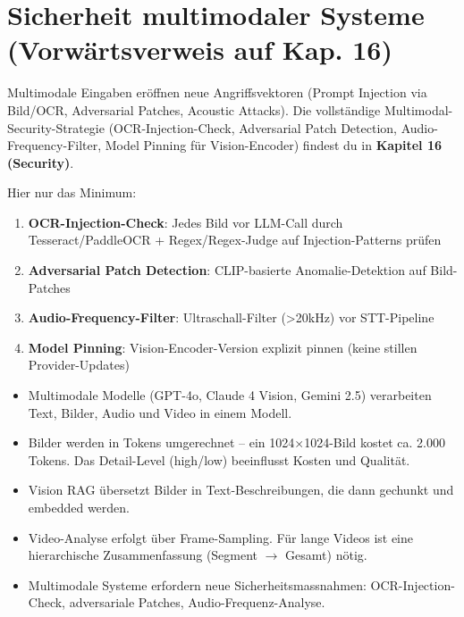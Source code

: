 \section{Sicherheit multimodaler Systeme (Vorwärtsverweis auf Kap. 16)}

Multimodale Eingaben eröffnen neue Angriffsvektoren (Prompt Injection via Bild/OCR, Adversarial Patches, Acoustic Attacks). Die vollständige Multimodal-Security-Strategie (OCR-Injection-Check, Adversarial Patch Detection, Audio-Frequency-Filter, Model Pinning für Vision-Encoder) findest du in \textbf{Kapitel 16 (Security)}.

Hier nur das Minimum:
\begin{enumerate}
    \item \textbf{OCR-Injection-Check}: Jedes Bild vor LLM-Call durch Tesseract/PaddleOCR + Regex/Regex-Judge auf Injection-Patterns prüfen
    \item \textbf{Adversarial Patch Detection}: CLIP-basierte Anomalie-Detektion auf Bild-Patches
    \item \textbf{Audio-Frequency-Filter}: Ultraschall-Filter (>20kHz) vor STT-Pipeline
    \item \textbf{Model Pinning}: Vision-Encoder-Version explizit pinnen (keine stillen Provider-Updates)
\end{enumerate}

\begin{zusammenfassungEnv}
\begin{itemize}[leftmargin=*]
    \item Multimodale Modelle (GPT-4o, Claude 4 Vision, Gemini 2.5) verarbeiten Text, Bilder, Audio und Video in einem Modell.
    \item Bilder werden in Tokens umgerechnet -- ein 1024$\times$1024-Bild kostet ca. 2.000 Tokens. Das Detail-Level (high/low) beeinflusst Kosten und Qualität.
    \item Vision RAG übersetzt Bilder in Text-Beschreibungen, die dann gechunkt und embedded werden.
    \item Video-Analyse erfolgt über Frame-Sampling. Für lange Videos ist eine hierarchische Zusammenfassung (Segment $\rightarrow$ Gesamt) nötig.
    \item Multimodale Systeme erfordern neue Sicherheitsmassnahmen: OCR-Injection-Check, adversariale Patches, Audio-Frequenz-Analyse.
\end{itemize}
\end{zusammenfassungEnv}




